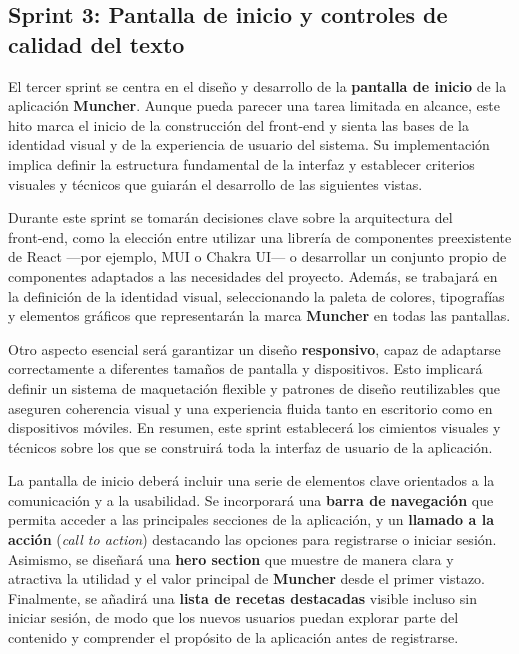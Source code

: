 \subsection*{Sprint 3: Pantalla de inicio y controles de calidad del texto}

El tercer sprint se centra en el diseño y desarrollo de la \textbf{pantalla de
	inicio} de la aplicación \textbf{Muncher}. Aunque pueda parecer una tarea
limitada en alcance, este hito marca el inicio de la construcción del front‑end
y sienta las bases de la identidad visual y de la experiencia de usuario del
sistema. Su implementación implica definir la estructura fundamental de la
interfaz y establecer criterios visuales y técnicos que guiarán el desarrollo
de las siguientes vistas.

Durante este sprint se tomarán decisiones clave sobre la arquitectura del
front‑end, como la elección entre utilizar una librería de componentes
preexistente de React —por ejemplo, MUI o Chakra UI— o desarrollar un conjunto
propio de componentes adaptados a las necesidades del proyecto. Además, se
trabajará en la definición de la identidad visual, seleccionando la paleta de
colores, tipografías y elementos gráficos que representarán la marca
\textbf{Muncher} en todas las pantallas.

Otro aspecto esencial será garantizar un diseño \textbf{responsivo}, capaz de
adaptarse correctamente a diferentes tamaños de pantalla y dispositivos. Esto
implicará definir un sistema de maquetación flexible y patrones de diseño
reutilizables que aseguren coherencia visual y una experiencia fluida tanto en
escritorio como en dispositivos móviles. En resumen, este sprint establecerá
los cimientos visuales y técnicos sobre los que se construirá toda la interfaz
de usuario de la aplicación.

La pantalla de inicio deberá incluir una serie de elementos clave orientados a
la comunicación y a la usabilidad. Se incorporará una \textbf{barra de
	navegación} que permita acceder a las principales secciones de la aplicación, y
un \textbf{llamado a la acción} (\textit{call to action}) destacando las
opciones para registrarse o iniciar sesión. Asimismo, se diseñará una
\textbf{hero section} que muestre de manera clara y atractiva la utilidad y el
valor principal de \textbf{Muncher} desde el primer vistazo. Finalmente, se
añadirá una \textbf{lista de recetas destacadas} visible incluso sin iniciar
sesión, de modo que los nuevos usuarios puedan explorar parte del contenido y
comprender el propósito de la aplicación antes de registrarse.

